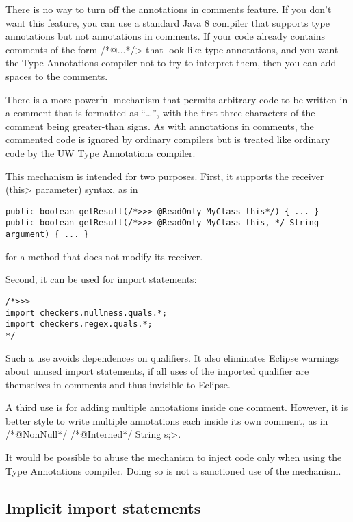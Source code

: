 There is no way to turn off the annotations in comments feature.  If you
don't want this feature, you can use a standard Java 8 compiler that
supports type annotations but not annotations in comments.  If your code
already contains comments of the form \</*@...*/> that look like type
annotations, and you want the Type Annotations compiler not to try to
interpret them, then you can add spaces to the comments.

There is a more powerful mechanism that permits arbitrary code to be
written in a comment that is formatted as ``\code{/*>>>}\ldots\code{*/}'',
with the first three characters of the comment being greater-than signs. As
with annotations in comments, the commented code is ignored by ordinary
compilers but is treated like ordinary code by the UW Type Annotations
compiler.

This mechanism is intended for two purposes.
First, it supports the receiver (\<this> parameter) syntax, as in

\begin{Verbatim}
public boolean getResult(/*>>> @ReadOnly MyClass this*/) { ... }
public boolean getResult(/*>>> @ReadOnly MyClass this, */ String argument) { ... }
\end{Verbatim}

\noindent
for a method that does not modify its receiver.

Second, it can be used for import statements:

\begin{Verbatim}
/*>>>
import checkers.nullness.quals.*;
import checkers.regex.quals.*;
*/
\end{Verbatim}

\noindent
Such a use avoids dependences on qualifiers.  It also eliminates Eclipse
warnings about unused import statements, if all uses of the imported
qualifier are themselves in comments and thus invisible to Eclipse.

A third use is for adding multiple annotations inside one
comment.  However, it is better style to write multiple annotations each
inside its own comment, as in \</*@NonNull*/ /*@Interned*/ String s;>.

It would be possible to abuse the  mechanism to inject
code only when using
the Type Annotations compiler.  Doing so is not a sanctioned use of the
mechanism.


\subsection{Implicit import statements\label{implicit-import-statements}}

